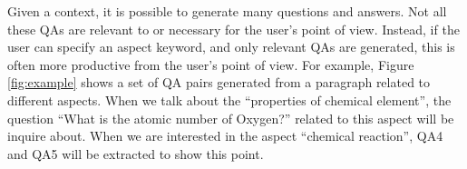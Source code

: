 Given a context, it is possible to generate many questions and answers.
Not all these QAs are relevant to or necessary for the user's point of view. 
Instead, if the user can specify an aspect keyword, and only relevant
QAs are generated, this is often more productive from the user's point of
view.
For example, Figure \ref{fig:example} shows a set of QA pairs generated from a paragraph related to different aspects. 
When we talk about the ``properties of chemical element'', the question ``What is the atomic number of Oxygen?'' related to this aspect will be inquire about.
When we are interested in the aspect ``chemical reaction'', QA4 and QA5 will be extracted to show this point.

